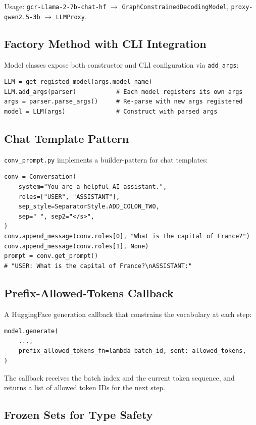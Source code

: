 \documentclass[11pt,a4paper,oneside,openany]{book}
\theoremstyle{definition}
\newcommand{\code}[1]{\texttt{#1}}
\newcommand{\file}[1]{\texttt{#1}}
\begin{document}
Usage: \code{gcr-Llama-2-7b-chat-hf} $\to$ \code{GraphConstrainedDecodingModel}, \code{proxy-qwen2.5-3b} $\to$ \code{LLMProxy}.

\subsection{Factory Method with CLI Integration}

Model classes expose both constructor and CLI configuration via \code{add\_args}:

\begin{lstlisting}
LLM = get_registed_model(args.model_name)
LLM.add_args(parser)           # Each model registers its own args
args = parser.parse_args()     # Re-parse with new args registered
model = LLM(args)              # Construct with parsed args
\end{lstlisting}

\subsection{Chat Template Pattern}

\file{conv\_prompt.py} implements a builder-pattern for chat templates:

\begin{lstlisting}
conv = Conversation(
    system="You are a helpful AI assistant.",
    roles=["USER", "ASSISTANT"],
    sep_style=SeparatorStyle.ADD_COLON_TWO,
    sep=" ", sep2="</s>",
)
conv.append_message(conv.roles[0], "What is the capital of France?")
conv.append_message(conv.roles[1], None)
prompt = conv.get_prompt()
# "USER: What is the capital of France?\nASSISTANT:"
\end{lstlisting}

\subsection{Prefix-Allowed-Tokens Callback}

A HuggingFace generation callback that constrains the vocabulary at each step:

\begin{lstlisting}
model.generate(
    ...,
    prefix_allowed_tokens_fn=lambda batch_id, sent: allowed_tokens,
)
\end{lstlisting}

The callback receives the batch index and the current token sequence, and returns a list of allowed token IDs for the next step.

\subsection{Frozen Sets for Type Safety}
\end{document}
